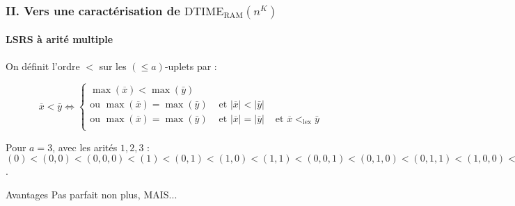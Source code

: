 \documentclass[10pt]{beamer}
\newcommand{\dtimeram}{\text{DTIME}_{\text{RAM}}\left( n^K \right)}
\newcommand{\leqa}{\left( \leqslant a \right)}
\begin{document}
	\begin{frame}
		\frametitle{II. Vers une caractérisation de $\dtimeram$}
		\framesubtitle{LSRS à arité multiple}
		
		\begin{defn}
			\label{def:bon_ordre_sur_uplets}
			On définit l'ordre $<$ sur les $\leqa$-uplets par :
			
			\[
			\overline{x} < \bar{y} \Leftrightarrow \left\lbrace
			\begin{array}{ccc}
			\max\left(\overline{x}\right) < \max\left(\bar{y}\right) & & \\
			\text{ou } \max\left(\overline{x}\right) = \max\left(\bar{y}\right) & 
			\text{ et } \left|\overline{x}\right| < \left|\bar{y}\right| & \\
			\text{ou } \max\left(\overline{x}\right) = \max\left(\bar{y}\right) & 
			\text{ et } \left|\overline{x}\right| = \left|\bar{y}\right| & 
			\text{ et } \overline{x} <_{\text{lex}} \bar{y}\\
			\end{array}
			\right. 
			\]
			
		\end{defn}
		
		\pause
		
		\begin{example}
			Pour $a = 3$, avec les arités $1,2,3$ : $(0) < (0, 0) < (0,0,0) < (1) < (0,1) < (1,0) < (1,1) < (0,0,1) < (0,1,0) < (0,1,1) < (1,0,0) < (1,0,1) < (1,1,0) < (1,1,1) < (2) < (0,2) < \dots$.
		\end{example}
		
		\pause 
		
		\begin{block}{Avantages}
			Pas parfait non plus, MAIS...
		\end{block}
	\end{frame}
	
\end{document}
